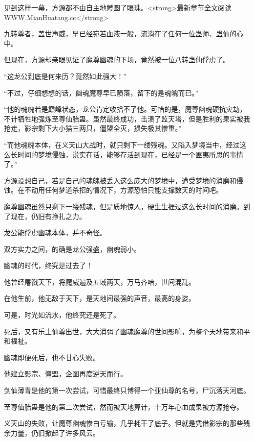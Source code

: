 
\begin{this_body}

见到这样一幕，方源都不由自主地瞪圆了眼珠。<strong>最新章节全文阅读WWW.MianHuatang.cc</strong>

九转尊者，盖世声威，早已经宛若血液一般，流淌在了任何一位蛊师、蛊仙的心中。

但现在，方源却亲眼见证了魔尊幽魂的下场，竟然被一位八转蛊仙俘虏了。

“这龙公到底是何来历？竟然如此强大！”

“不过，仔细想想的话，幽魂魔尊早已陨落，留下的是魂魄而已。”

“他的魂魄若是巅峰状态，龙公肯定收拾不了他。可惜的是，魔尊幽魂硬抗灾劫，不计牺牲地强炼至尊仙胎蛊。虽然最终成功，击溃了监天塔，但是胜利的果实被我抢走，影宗剩下大小猫三两只，僵盟全灭，损失极其惨重。”

“而他魂魄本体，在义天山大战时，就只剩下一缕残魂。又陷入梦境当中，经过这么长时间的梦境侵蚀，说实在话，能够存活到现在，已经是一个匪夷所思的事情了。”

方源设想自己，若是自己的魂魄被丢入这么庞大的梦境中，遭受梦境的消磨和侵蚀。在不动用任何梦道杀招的情况下，方源恐怕只能支撑数天的时间吧。

魔尊幽魂虽然只剩下一缕残魂，但是质地惊人，硬生生捱过这么长时间的消磨。到了现在，仍旧有挣扎之力。

龙公能俘虏幽魂本体，并不奇怪。

双方实力之间，的确是龙公强盛，幽魂弱小。

幽魂的时代，终究是过去了！

他曾经屠戮天下，将魔威遍及五域两天，万马齐喑，世间混乱。

在他生前，他无敌于天下，是天地间最强的声音，最高的身姿。

可是，时光如流水，他终究还是死了。

死后，又有乐土仙尊出世，大大消弭了幽魂魔尊的世间影响，为整个天地带来和平和福祉。

幽魂即便死后，也不甘心失败。

他建立影宗、僵盟，企图再度逆天而行。

剑仙薄青是他的第一次尝试，可惜最终只博得一个亚仙尊的名号，尸沉落天河底。

至尊仙胎蛊是他的第二次尝试，然而被天地算计，十万年心血成果被方源抢夺。

义天山的失败，让魔尊幽魂惨白亏输，几乎耗干了底子。但就是凭借影宗的那些残余力量，仍旧掀起了许多风云。


\end{this_body}
